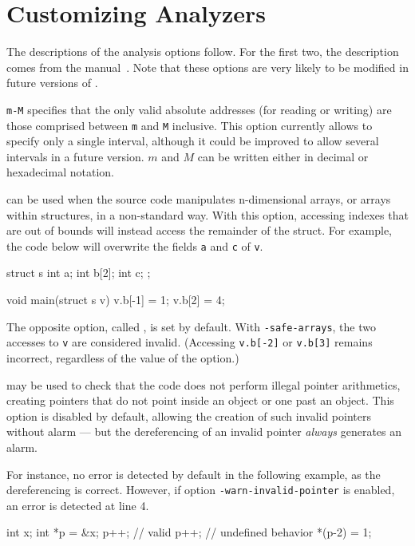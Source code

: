 \section{Customizing Analyzers}\label{sec:customizing-analyzers}

The descriptions of the analysis options follow. For the first two, the
description comes from the \Value manual~\cite{value}. Note that
these options are very likely to be modified in future versions of \FramaC.

\begin{description}
\item {} \texttt{m-M}
specifies that the only valid absolute addresses (for reading or writing)
are those comprised between \lstinline$m$ and \lstinline$M$ inclusive.
This option currently allows to specify only a single interval,
although it could be improved to allow several intervals
in a future version. $m$ and $M$
can be written either in decimal or hexadecimal notation.

\item {} can be used when the source
code manipulates n-dimensional arrays, or arrays within structures,
in a non-standard way. With this option, accessing
indexes that are out of bounds will instead access
the remainder of the struct. For example, the code below will overwrite
the fields \lstinline|a| and \lstinline|c| of \lstinline|v|.
\begin{ccode}
struct s {
  int a;
  int b[2];
  int c;
};

void main(struct s v) {
  v.b[-1] = 1;
  v.b[2] = 4;
}
\end{ccode}
The opposite option, called , is set by default.
With \texttt{-safe-arrays}, the two accesses to \lstinline|v| are considered
invalid. (Accessing \lstinline|v.b[-2]| or \lstinline|v.b[3]| remains incorrect,
regardless of the value of the option.)

\item {} may be used to check that the code
  does not perform illegal pointer arithmetics, creating pointers that do not
  point inside an object or one past an object.
  This option is disabled by default, allowing the creation of such invalid
  pointers without alarm — but the dereferencing of an invalid pointer
  \emph{always} generates an alarm.

  For instance, no error is detected by default in the following example, as
  the dereferencing is correct. However, if option
  \texttt{-warn-invalid-pointer} is enabled, an error is detected at line 4.
  \begin{ccode}
    int x;
    int *p = &x;
    p++;  // valid
    p++;  // undefined behavior
    *(p-2) = 1;
  \end{ccode}


\end{description}
